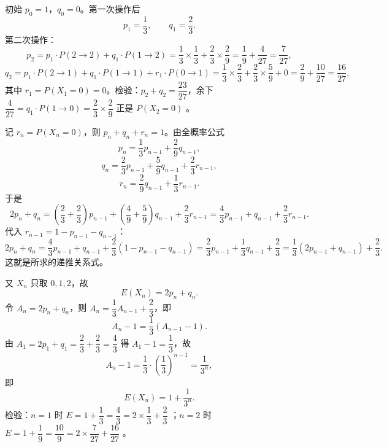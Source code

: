 \begin{answer}

初始 $p_0=1$，$q_0=0$。第一次操作后
\nopagebreak[4]
\[p_1=\frac13,\qquad q_1=\frac23 .\]
第二次操作：
\nopagebreak[4]
\[p_2=p_1\cdot P(2\to2)+q_1\cdot P(1\to2)=\frac13\times\frac13+\frac23\times\frac29=\frac19+\frac4{27}=\frac7{27},\]
\nopagebreak[4]
\[q_2=p_1\cdot P(2\to1)+q_1\cdot P(1\to1)+r_1\cdot P(0\to1)=\frac13\times\frac23+\frac23\times\frac59+0=\frac29+\frac{10}{27}=\frac{16}{27},\]
其中 $r_1=P(X_1=0)=0$。检验：$p_2+q_2=\dfrac{23}{27}$，余下 $\dfrac4{27}=q_1\cdot P(1\to0)=\dfrac23\times\dfrac29$ 正是 $P(X_2=0)$ 。


记 $r_n=P(X_n=0)$，则 $p_n+q_n+r_n=1$。由全概率公式
\nopagebreak[4]
\[p_n=\frac13p_{n-1}+\frac29q_{n-1},\]
\nopagebreak[4]
\[q_n=\frac23p_{n-1}+\frac59q_{n-1}+\frac23r_{n-1},\]
\nopagebreak[4]
\[r_n=\frac29q_{n-1}+\frac13r_{n-1}.\]
于是
\nopagebreak[4]
\[2p_n+q_n=\left(\frac23+\frac23\right)p_{n-1}+\left(\frac49+\frac59\right)q_{n-1}+\frac23r_{n-1}
=\frac43p_{n-1}+q_{n-1}+\frac23r_{n-1}.\]
代入 $r_{n-1}=1-p_{n-1}-q_{n-1}$：
\nopagebreak[4]
\[2p_n+q_n=\frac43p_{n-1}+q_{n-1}+\frac23\left(1-p_{n-1}-q_{n-1}\right)
=\frac23p_{n-1}+\frac13q_{n-1}+\frac23
=\frac13\left(2p_{n-1}+q_{n-1}\right)+\frac23 .\]
这就是所求的递推关系式。

又 $X_n$ 只取 $0,1,2$，故
\nopagebreak[4]
\[E(X_n)=2p_n+q_n .\]
令 $A_n=2p_n+q_n$，则 $A_n=\dfrac13A_{n-1}+\dfrac23$，即
\nopagebreak[4]
\[A_n-1=\frac13\left(A_{n-1}-1\right).\]
由 $A_1=2p_1+q_1=\dfrac23+\dfrac23=\dfrac43$ 得 $A_1-1=\dfrac13$，故
\nopagebreak[4]
\[A_n-1=\frac13\cdot\left(\frac13\right)^{n-1}=\frac1{3^n},\]
即
\nopagebreak[4]
\[E(X_n)=1+\frac1{3^n}.\]
检验：$n=1$ 时 $E=1+\dfrac13=\dfrac43=2\times\dfrac13+\dfrac23$ ；$n=2$ 时 $E=1+\dfrac19=\dfrac{10}9=2\times\dfrac7{27}+\dfrac{16}{27}$ 。



\end{answer}